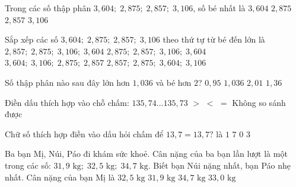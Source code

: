 \begin{ex} %
Trong các số thập phân $3{,}604;\; 2{,}875;\; 2{,}857;\; 3{,}106$, số bé nhất là
\choice
{$3{,}604$}
{$2{,}875$}
{\True $2{,}857$}
{$3{,}106$}
\end{ex}

\begin{ex} %
Sắp xếp các số $3{,}604;\; 2{,}875;\; 2{,}857;\; 3{,}106$ theo thứ tự từ bé đến lớn là
\choice
{\True $2{,}857;\; 2{,}875;\; 3{,}106;\; 3{,}604$}
{$2{,}875;\; 2{,}857;\; 3{,}106;\; 3{,}604$}
{$3{,}604;\; 3{,}106;\; 2{,}875;\; 2{,}857$}
{$2{,}857;\; 2{,}875;\; 3{,}604;\; 3{,}106$}
\end{ex}

\begin{ex} %
Số thập phân nào sau đây lớn hơn $1{,}036$ và bé hơn $2$?
\choice
{$0{,}95$}
{$1{,}036$}
{$2{,}01$}
{\True $1{,}36$}
\end{ex}

\begin{ex} %
Điền dấu thích hợp vào chỗ chấm: $135{,}74 \dots 135{,}73$
\choice
{\True $>$}
{$<$}
{$=$}
{Không so sánh được}
\end{ex}

\begin{ex} %
Chữ số thích hợp điền vào dấu hỏi chấm để $13{,}7 = 13{,}7?$ là
\choice
{$1$}
{$7$}
{\True $0$}
{$3$}
\end{ex}

\begin{ex} %
Ba bạn Mị, Núi, Páo đi khám sức khoẻ. Cân nặng của ba bạn lần lượt là một trong các số: $31{,}9\text{ kg};\; 32{,}5\text{ kg};\; 34{,}7\text{ kg}$. Biết bạn Núi nặng nhất, bạn Páo nhẹ nhất. Cân nặng của bạn Mị là
\choice
{\True $32{,}5\text{ kg}$}
{$31{,}9\text{ kg}$}
{$34{,}7\text{ kg}$}
{$33{,}0\text{ kg}$}
\end{ex}

